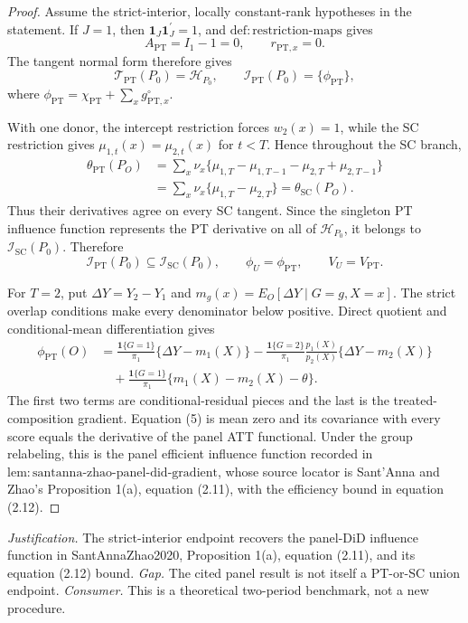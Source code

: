 \documentclass{article}
\begin{document}
\begin{proof}
Assume the strict-interior, locally constant-rank hypotheses in the statement.  If \(J=1\), then \(\mathbf 1_J\mathbf 1_J^{\prime}=1\), and \(\mathrm{def{:}restriction\text{-}maps}\) gives
\[
 A_{\mathrm{PT}}=I_1-1=0,
 \qquad
 r_{\mathrm{PT},x}=0.
 \tag{1}
\]
The tangent normal form therefore gives
\[
 \mathcal T_{\mathrm{PT}}(P_0)=\mathcal H_{P_0},
 \qquad
 \mathcal I_{\mathrm{PT}}(P_0)=\{\phi_{\mathrm{PT}}\},
 \tag{2}
\]
where \(\phi_{\mathrm{PT}}=\chi_{\mathrm{PT}}+\sum_xg^{\circ}_{\mathrm{PT},x}\).

With one donor, the intercept restriction forces \(w_2(x)=1\), while the SC restriction gives \(\mu_{1,t}(x)=\mu_{2,t}(x)\) for \(t<T\).  Hence throughout the SC branch,
\[
 \begin{aligned}
 \theta_{\mathrm{PT}}(P_O)
 &=\sum_x\nu_x\{\mu_{1,T}-\mu_{1,T-1}-\mu_{2,T}+\mu_{2,T-1}\}\\
 &=\sum_x\nu_x\{\mu_{1,T}-\mu_{2,T}\}
 =\theta_{\mathrm{SC}}(P_O).
 \end{aligned}
 \tag{3}
\]
Thus their derivatives agree on every SC tangent.  Since the singleton PT influence function represents the PT derivative on all of \(\mathcal H_{P_0}\), it belongs to \(\mathcal I_{\mathrm{SC}}(P_0)\).  Therefore
\[
 \mathcal I_{\mathrm{PT}}(P_0)\subseteq\mathcal I_{\mathrm{SC}}(P_0),
 \qquad
 \phi_U=\phi_{\mathrm{PT}},
 \qquad
 V_U=V_{\mathrm{PT}}.
 \tag{4}
\]

For \(T=2\), put \(\Delta Y=Y_2-Y_1\) and \(m_g(x)=E_O[\Delta Y\mid G=g,X=x]\).  The strict overlap conditions make every denominator below positive.  Direct quotient and conditional-mean differentiation gives
\[
 \begin{aligned}
 \phi_{\mathrm{PT}}(O)
 &=\frac{\mathbf 1\{G=1\}}{\pi_1}\{\Delta Y-m_1(X)\}
 -\frac{\mathbf 1\{G=2\}}{\pi_1}\frac{p_1(X)}{p_2(X)}\{\Delta Y-m_2(X)\}\\
 &\quad+\frac{\mathbf 1\{G=1\}}{\pi_1}\{m_1(X)-m_2(X)-\theta\}.
 \end{aligned}
 \tag{5}
\]
The first two terms are conditional-residual pieces and the last is the treated-composition gradient.  Equation (5) is mean zero and its covariance with every score equals the derivative of the panel ATT functional.  Under the group relabeling, this is the panel efficient influence function recorded in \(\mathrm{lem{:}santanna\text{-}zhao\text{-}panel\text{-}did\text{-}gradient}\), whose source locator is Sant'Anna and Zhao's Proposition 1(a), equation (2.11), with the efficiency bound in equation (2.12).
\end{proof}
\par\smallskip\noindent \textit{Justification.} The strict-interior endpoint recovers the panel-DiD influence function in SantAnnaZhao2020, Proposition 1(a), equation (2.11), and its equation (2.12) bound. \textit{Gap.} The cited panel result is not itself a PT-or-SC union endpoint. \textit{Consumer.} This is a theoretical two-period benchmark, not a new procedure.
\end{document}
